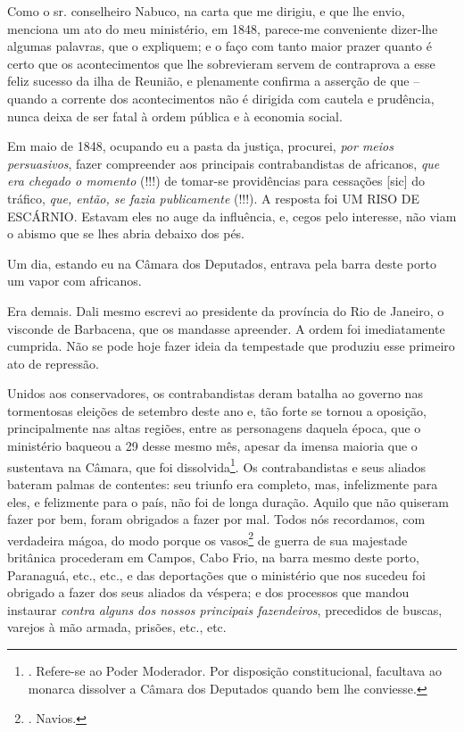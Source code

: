 Como o sr. conselheiro Nabuco, na carta que me dirigiu, e que lhe envio,
menciona um ato do meu ministério, em 1848, parece-me conveniente
dizer-lhe algumas palavras, que o expliquem; e o faço com tanto maior
prazer quanto é certo que os acontecimentos que lhe sobrevieram servem
de contraprova a esse feliz sucesso da ilha de Reunião, e plenamente
confirma a asserção de que -- quando a corrente dos acontecimentos não é
dirigida com cautela e prudência, nunca deixa de ser fatal à ordem
pública e à economia social.

Em maio de 1848, ocupando eu a pasta da justiça, procurei, \emph{por
meios persuasivos}, fazer compreender aos principais contrabandistas de
africanos, \emph{que era chegado o momento} (!!!) de tomar-se
providências para cessações {[}sic{]} do tráfico, \emph{que, então, se
fazia publicamente} (!!!). A resposta foi UM RISO DE ESCÁRNIO. Estavam
eles no auge da influência, e, cegos pelo interesse, não viam o abismo
que se lhes abria debaixo dos pés.

Um dia, estando eu na Câmara dos Deputados, entrava pela barra deste
porto um vapor com africanos.

Era demais. Dali mesmo escrevi ao presidente da província do Rio de
Janeiro, o visconde de Barbacena, que os mandasse apreender. A ordem foi
imediatamente cumprida. Não se pode hoje fazer ideia da tempestade que
produziu esse primeiro ato de repressão.

Unidos aos conservadores, os contrabandistas deram batalha ao governo
nas tormentosas eleições de setembro deste ano e, tão forte se tornou a
oposição, principalmente nas altas regiões, entre as personagens daquela
época, que o ministério baqueou a 29 desse mesmo mês, apesar da imensa
maioria que o sustentava na Câmara, que foi dissolvida\footnote{.
  Refere-se ao Poder Moderador. Por disposição constitucional, facultava
  ao monarca dissolver a Câmara dos Deputados quando bem lhe conviesse.}.
Os contrabandistas e seus aliados bateram palmas de contentes: seu
triunfo era completo, mas, infelizmente para eles, e felizmente para o
país, não foi de longa duração. Aquilo que não quiseram fazer por bem,
foram obrigados a fazer por mal. Todos nós recordamos, com verdadeira
mágoa, do modo porque os vasos\footnote{. Navios.} de guerra de sua
majestade britânica procederam em Campos, Cabo Frio, na barra mesmo
deste porto, Paranaguá, etc., etc., e das deportações que o ministério
que nos sucedeu foi obrigado a fazer dos seus aliados da véspera; e dos
processos que mandou instaurar \emph{contra alguns dos nossos principais
fazendeiros}, precedidos de buscas, varejos à mão armada, prisões, etc.,
etc.

